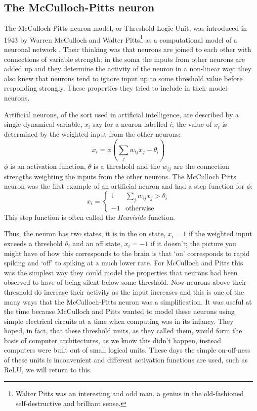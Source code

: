 \documentclass[12pt]{article}
\begin{document}
\subsection*{The McCulloch-Pitts neuron}


The McCulloch Pitts neuron model, or Threshold Logic Unit, was
introduced in 1943 by Warren McCulloch and Walter
Pitts\footnote{Walter Pitts was an interesting and odd man, a genius
in the old-fashioned self-destructive and brilliant sense.} as a
computational model of a neuronal network
\cite{McCullochPitts1943}. Their thinking was that neurons are joined
to each other with connections of variable strength; in the soma the
inputs from other neurons are added up and they determine the activity
of the neuron in a non-linear way; they also knew that neurons tend to
ignore input up to some threshold value before responding
strongly. These properties they tried to include in their model
neurons.

Artificial neurons, of the sort used in artificial intelligence, are
described by a single dynamical variable, $x_i$ say for a neuron
labelled $i$; the value of $x_i$ is determined by the weighted input
from the other neurons:
\begin{equation}
x_i=\phi\left(\sum_j w_{ij} x_j-\theta_i\right)
\end{equation}
$\phi$ is an activation function, $\theta$ is a threshold and the
$w_{ij}$ are the connection strengths weighting the inputs from the
other neurons. The McCulloch Pitts neuron was the first example of an
artificial neuron and had a step function for $\phi$:
\begin{equation}
x_i=\left\{\begin{array}{ll}1&\sum_j w_{ij} x_j>\theta_i\\-1&\mbox{otherwise}\end{array}\right.
\end{equation}
This step function is often called the \textsl{Heaviside} function.

Thus, the neuron has two states, it is in the on state, $x_i=1$ if the
weighted input exceeds a threshold $\theta_i$ and an off state,
$x_i=-1$ if it doesn't; the picture you might have of how this
corresponds to the brain is that \lq{}on\rq{} corresponds to rapid
spiking and \lq{}off\rq{} to spiking at a much lower rate.  For
McCulloch and Pitts this was the simplest way they could model the
properties that neurons had been observed to have of being silent
below some threshold. Now neurons above their threshold do increase
their activity as the input increases and this is one of the many ways
that the McCulloch-Pitts neuron was a simplification. It was useful at
the time because McCulloch and Pitts wanted to model these neurons
using simple electrical circuits at a time when computing was in its
infancy. They hoped, in fact, that these threshold units, as they
called them, would form the basis of computer architectures, as we
know this didn't happen, instead computers were built out of small
logical units. These days the simple on-off-ness of these units is
inconvenient and different activation functions are used, such as ReLU, we will return to this.
\end{document}
